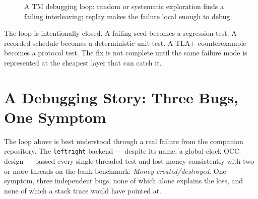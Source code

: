 \begin{figure}[htbp]
\centering
{}
\caption{A TM debugging loop: random or systematic exploration finds a failing interleaving; replay makes the failure local enough to debug.}
\label{fig:tm-debugging-loop}
\end{figure}

The loop is intentionally closed. A failing seed becomes a regression test. A recorded schedule becomes a deterministic unit test. A TLA+ counterexample becomes a protocol test. The fix is not complete until the same failure mode is represented at the cheapest layer that can catch it.

\section{A Debugging Story: Three Bugs, One Symptom}
\label{sec:debugging-story}

The loop above is best understood through a real failure from the companion
repository. The \texttt{leftright} backend --- despite its name, a global-clock
OCC design --- passed every single-threaded test and lost money consistently
with two or more threads on the bank benchmark: \emph{Money created/destroyed}.
One symptom, three independent bugs, none of which alone explains the loss,
and none of which a stack trace would have pointed at.

